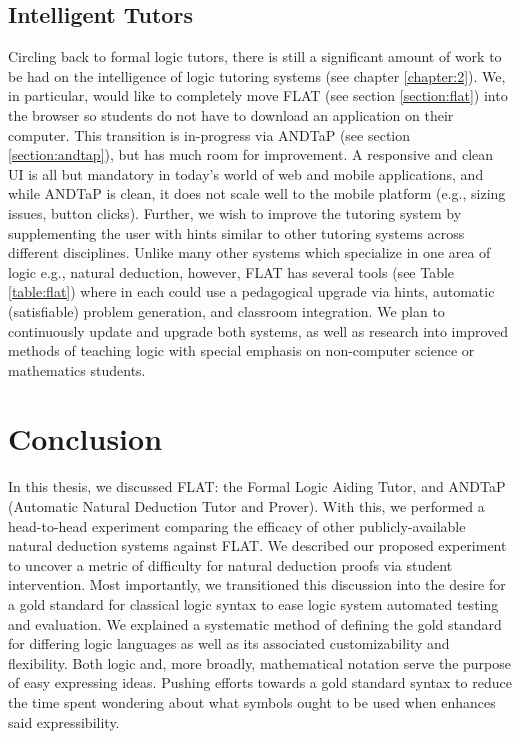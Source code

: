 \documentclass[ms]{uncgdissertationexp2}
\theoremstyle{plain}
\theoremstyle{definition}
\theoremstyle{remark}
\begin{document}
\subsection{Intelligent Tutors}
Circling back to formal logic tutors, there is still a significant amount of work to be had on the intelligence of logic tutoring systems (see chapter \ref{chapter:2}). We, in particular, would like to completely move FLAT (see section \ref{section:flat}) into the browser so students do not have to download an application on their computer. This transition is in-progress via ANDTaP (see section \ref{section:andtap}), but has much room for improvement. A responsive and clean UI is all but mandatory in today's world of web and mobile applications, and while ANDTaP is clean, it does not scale well to the mobile platform (e.g., sizing issues, button clicks). Further, we wish to improve the tutoring system by supplementing the user with hints similar to other tutoring systems across different disciplines. Unlike many other systems which specialize in one area of logic e.g., natural deduction, however, FLAT has several tools (see Table \ref{table:flat}) where in each could use a pedagogical upgrade via hints, automatic (satisfiable) problem generation, and classroom integration. We plan to continuously update and upgrade both systems, as well as research into improved methods of teaching logic with special emphasis on non-computer science or mathematics students.

\section{Conclusion}
In this thesis, we discussed FLAT: the Formal Logic Aiding Tutor, and ANDTaP (Automatic Natural Deduction Tutor and Prover). With this, we performed a head-to-head experiment comparing the efficacy of other publicly-available natural deduction systems against FLAT. We described our proposed experiment to uncover a metric of difficulty for natural deduction proofs via student intervention. Most importantly, we transitioned this discussion into the desire for a gold standard for classical logic syntax to ease logic system automated testing and evaluation. We explained a systematic method of defining the gold standard for differing logic languages as well as its associated customizability and flexibility. Both logic and, more broadly, mathematical notation serve the purpose of easy expressing ideas. Pushing efforts towards a gold standard syntax to reduce the time spent wondering about what symbols ought to be used when enhances said expressibility.
\end{document}
